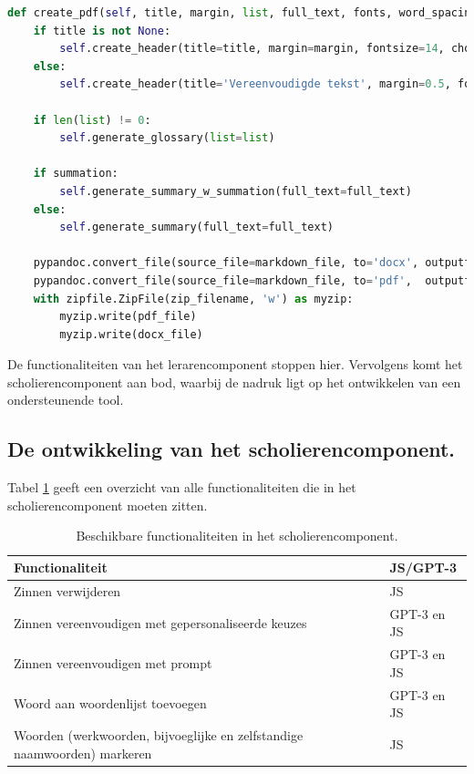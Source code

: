 \begin{lstlisting}[language=Python, caption={Een zip-bestand aanmaken met daarin een docx en pdf bestand van de vereenvoudigde tekst.}, label={code:writer-create-pdf}]
def create_pdf(self, title, margin, list, full_text, fonts, word_spacing, type_spacing, summation):
	if title is not None:
		self.create_header(title=title, margin=margin, fontsize=14, chosen_font=fonts[0], chosen_title_font=fonts[1], word_spacing=word_spacing, type_spacing=type_spacing)
	else:
		self.create_header(title='Vereenvoudigde tekst', margin=0.5, fontsize=14, chosen_font=fonts[0], chosen_title_font=fonts[1], word_spacing=word_spacing, type_spacing=type_spacing)
	
	if len(list) != 0:
		self.generate_glossary(list=list)
	
	if summation:
		self.generate_summary_w_summation(full_text=full_text)
	else:
		self.generate_summary(full_text=full_text)
	
	pypandoc.convert_file(source_file=markdown_file, to='docx', outputfile=docx_file,   extra_args=["-M2GB", "+RTS", "-K64m", "-RTS"])
	pypandoc.convert_file(source_file=markdown_file, to='pdf',  outputfile=pdf_file,    extra_args=['--pdf-engine=xelatex'])
	with zipfile.ZipFile(zip_filename, 'w') as myzip:
		myzip.write(pdf_file)
		myzip.write(docx_file)
\end{lstlisting}

De functionaliteiten van het lerarencomponent stoppen hier. Vervolgens komt het scholierencomponent aan bod, waarbij de nadruk ligt op het ontwikkelen van een ondersteunende tool.

\subsection{De ontwikkeling van het scholierencomponent.}

Tabel \ref{table:beschikbare-functionaliteiten-scholierencomponent} geeft een overzicht van alle functionaliteiten die in het scholierencomponent moeten zitten.

\begin{table}
	\begin{tabular}{| m{10cm} | m{5cm} |}
		\hline
		\textbf{Functionaliteit} & \textbf{JS/GPT-3} \\ \hline
		Zinnen verwijderen & JS \\ \hline
		Zinnen vereenvoudigen met gepersonaliseerde keuzes & GPT-3 en JS \\ \hline
		Zinnen vereenvoudigen met prompt & GPT-3 en JS \\ \hline
		Woord aan woordenlijst toevoegen & GPT-3 en JS \\ \hline
		Woorden (werkwoorden, bijvoeglijke en zelfstandige naamwoorden) markeren & JS \\ \hline
	\end{tabular}
	\caption{Beschikbare functionaliteiten in het scholierencomponent.}
	\label{table:beschikbare-functionaliteiten-scholierencomponent}
\end{table}

